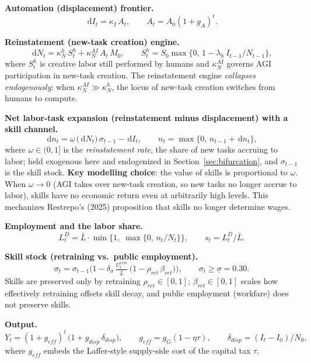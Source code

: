 \documentclass[review,12pt]{elsarticle}
\theoremstyle{plain}
\theoremstyle{definition}
\theoremstyle{remark}
\newcommand{\dd}{\,\mathrm{d}}
\newcommand{\barL}{\bar{L}}
\begin{document}
\textbf{Automation (displacement) frontier.}
\begin{equation}
\dd I_t=\kappa_I\,A_t,\qquad A_t=A_0(1+g_A)^t.
\end{equation}

\textbf{Reinstatement (new-task creation) engine.}
\begin{equation}
\dd N_t=\kappa_N^{h}\,S_t^h+\kappa_N^{AI}\,A_t\,M_0,
\qquad S_t^h=S_0\max\{0,\,1-\lambda_h\,I_{t-1}/N_{t-1}\},
\end{equation}
where $S_t^h$ is creative labor still performed by humans and $\kappa_N^{AI}$ governs AGI participation in new-task creation. The reinstatement engine \emph{collapses endogenously}: when $\kappa_N^{AI}\gg\kappa_N^h$, the locus of new-task creation switches from humans to compute.

\textbf{Net labor-task expansion (reinstatement minus displacement) with a skill channel.}
\begin{equation}
\dd n_t=\omega\,\big(\dd N_t\big)\,\sigma_{t-1}-\dd I_t,\qquad
n_t=\max\{0,\,n_{t-1}+\dd n_t\},
\end{equation}
where $\omega\in(0,1]$ is the \emph{reinstatement rate}, the share of new tasks accruing to labor; held exogenous here and endogenized in Section~\ref{sec:bifurcation}, and $\sigma_{t-1}$ is the skill stock. \textbf{Key modelling choice}: the value of skills is proportional to $\omega$. When $\omega\to0$ (AGI takes over new-task creation, so new tasks no longer accrue to labor), skills have no economic return even at arbitrarily high levels. This mechanizes Restrepo's (2025) proposition that skills no longer determine wages.

\textbf{Employment and the labor share.}
\begin{equation}
L_t^D=\barL\cdot\min\{1,\;\max\{0,\,n_t/N_t\}\},\qquad s_t=L_t^D/\barL.
\end{equation}

\textbf{Skill stock (retraining vs.\ public employment).}
\begin{equation}
\sigma_t=\sigma_{t-1}\Big(1-\delta_\sigma\,\tfrac{U_t^{rem}}{\barL}\,\big(1-\rho_{ret}\,\beta_{ret}\big)\Big),\qquad
\sigma_t\ge\underline{\sigma}=0.30.
\end{equation}
Skills are preserved only by retraining $\rho_{ret}\in[0,1]$; $\beta_{ret}\in[0,1]$ scales how effectively retraining offsets skill decay, and public employment (workfare) does not preserve skills.

\textbf{Output.}
\begin{equation}
Y_t=(1+g_{eff})^t\,\big(1+g_{disp}\,\delta_{disp}\big),\qquad
g_{eff}=g_G(1-\eta\tau),\qquad \delta_{disp}=(I_t-I_0)/N_0,
\end{equation}
where $g_{eff}$ embeds the Laffer-style supply-side cost of the capital tax $\tau$.
\end{document}
